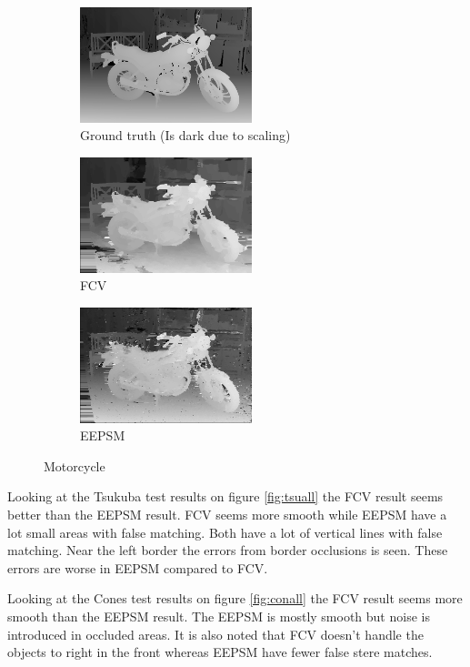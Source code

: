 \begin{figure}[ht]
  \centering
  \begin{subfigure}[t]{0.3\textwidth}
    \centering\includegraphics[width=5cm]{figures/mot_gt.png}
    \caption{Ground truth \cite{Scharstein2014} (Is dark due to scaling) \label{fig:mot_gt}}
  \end{subfigure}\hspace{0.5cm}
  \begin{subfigure}[t]{0.3\textwidth}
    \centering\includegraphics[width=5cm]{figures/mot_fcv}
    \caption{FCV\label{fig:mot_fcv}}
  \end{subfigure}\hspace{0.5cm}
  \begin{subfigure}[t]{0.3\textwidth}
    \centering\includegraphics[width=5cm]{figures/mot_eepsm1}
    \caption{EEPSM\label{fig:mot_eepsm}}
  \end{subfigure}
  \caption{Motorcycle \cite{Scharstein2014}\label{fig:motall}}
\end{figure}

Looking at the Tsukuba test results on figure \vref{fig:tsuall} the FCV result seems better than the EEPSM result. FCV seems more smooth while EEPSM have a lot small areas with false matching. Both have a lot of vertical lines with false matching. Near the left border the errors from border occlusions is seen. These errors are worse in EEPSM compared to FCV.

Looking at the Cones test results on figure \vref{fig:conall} the FCV result seems more smooth than  the EEPSM result. The EEPSM is mostly smooth but noise is introduced in occluded areas. It is also noted that FCV doesn't handle the objects to right in the front whereas EEPSM have fewer false stere matches.

